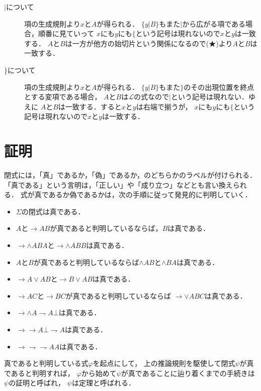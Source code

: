 \documentclass[a4j,10.5pt,oneside,openany]{jsbook}
\theoremstyle{mystyle}
\begin{document}
\begin{description}
		\item[$|$について]
			項の生成規則より$x$と$A$が得られる．
			$\{y|B\}$もまた$|$から広がる項である場合，順番に見ていって
			$x$にも$y$にも$\{$という記号は現れないので$x$と$y$は一致する．
			$A$と$B$は一方が他方の始切片という関係になるので(★)より$A$と$B$は一致する．
			
		\item[$\}$について]
			項の生成規則より$x$と$A$が得られる．
			$\{y|B\}$もまた$\}$のその出現位置を終点とする変項である場合，
			$A$と$B$は$\mathcal{L}$の式なので$|$という記号は現れない．ゆえに
			$A$と$B$は一致する．すると$x$と$y$は右端で揃うが，
			$x$にも$y$にも$\{$という記号は現れないので$x$と$y$は一致する．
	\end{description}

\section{証明}
	閉式には，「真」であるか，「偽」であるか，のどちらかのラベルが付けられる．
	「真である」という言明は，「正しい」や「成り立つ」などとも言い換えられる．
	式が真であるか偽であるかは，次の手順に従って発見的に判明していく．
	
	\begin{itemize}
		\item $\Sigma$の閉式は真である．
		\item $A$と$\rightarrow AB$が真であると判明しているならば，$B$は真である．
		\item $\rightarrow \wedge ABA$と$\rightarrow \wedge ABB$は真である．
		\item $A$と$B$が真であると判明しているならば$\wedge AB$と$\wedge BA$は真である．
		\item $\rightarrow A\vee AB$と$\rightarrow B \vee AB$は真である．
		\item $\rightarrow AC$と$\rightarrow BC$が真であると判明しているならば
			$\rightarrow \vee ABC$は真である．
		\item $\rightarrow\wedge A \rightharpoondown A \bot$は真である．
		\item $\rightarrow \rightarrow A \bot \rightharpoondown A$は真である．
		\item $\rightarrow \rightharpoondown\rightharpoondown AA$は真である．
	\end{itemize}
	
	真であると判明している式$\varphi$を起点にして，
	上の推論規則を駆使して閉式$\psi$が真であると判明すれば，
	$\varphi$から始めて$\psi$が真であることに辿り着くまでの手続きは$\psi$の証明と呼ばれ，
	$\psi$は定理と呼ばれる．
	
\end{document}

